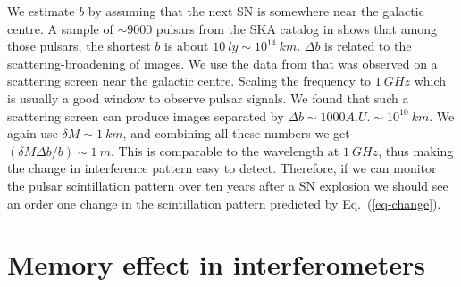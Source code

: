 \documentclass[aps,showpacs,onecolumn,floats,prd,superscriptaddress,nofootinbib]{revtex4-1}
\begin{document}
We estimate $b$ by assuming that the next SN is somewhere near the galactic centre. A sample of $\sim 9000$ pulsars from the SKA catalog in \cite{MSPpopulation} shows that among those pulsars, the shortest $b$ is about $10\ ly \sim 10^{14} \ km$. $\Delta b$ is related to the scattering-broadening of images. We use the data from \cite{BowBel13} that was observed on a scattering screen near the galactic centre. Scaling the frequency to $1\ GHz$ which is usually a good window to observe pulsar signals. We found that such a scattering screen can produce images separated by $\Delta b\sim 1000A.U. \sim 10^{10} \ km$. We again use $\delta M \sim 1 \ km$, and combining all these numbers we get $(\delta M \Delta b / b) \sim 1 \ m$. This is comparable to the wavelength at $1 \ GHz$, thus making the change in interference pattern easy to detect. Therefore, if we can monitor the pulsar scintillation pattern over ten years after a SN explosion we should see an order one change in the scintillation pattern predicted by Eq.~(\ref{eq-change}). 

\section{Memory effect in interferometers}
\label{RelV}
\end{document}
